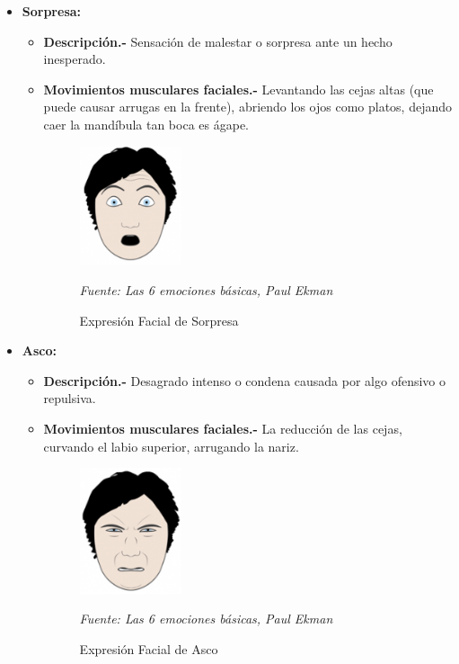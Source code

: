 \begin{itemize}
\item {\textbf{Sorpresa:} 
\begin{itemize}
\item \textbf{Descripción.-} Sensación de malestar o sorpresa ante un hecho inesperado.
\item { \textbf{Movimientos musculares faciales.-} Levantando las cejas altas (que puede causar arrugas en la frente), abriendo los ojos como platos, dejando caer la mandíbula tan boca es ágape.

\begin{figure}[H]
		\centering
		\includegraphics[width=30mm]{./Imagenes/sorpresa.png}
		\caption{Expresión Facial de Sorpresa}
		\vspace{0.15cm}
		\textit{Fuente: Las 6 emociones básicas, Paul Ekman}
		\label{fig:sorpresa}
\end{figure}}
\end{itemize}}


\item {\textbf{Asco:} 
\begin{itemize}
\item \textbf{Descripción.-} Desagrado intenso o condena causada por algo ofensivo o repulsiva.
\item { \textbf{Movimientos musculares faciales.-} La reducción de las cejas, curvando el labio superior, arrugando la nariz.

\begin{figure}[H]
		\centering
		\includegraphics[width=30mm]{./Imagenes/asco.png}
		\caption{Expresión Facial de Asco}
		\vspace{0.15cm}
		\textit{Fuente: Las 6 emociones básicas, Paul Ekman}
		\label{fig:asco}
\end{figure}}
\end{itemize}}




\end{itemize}
